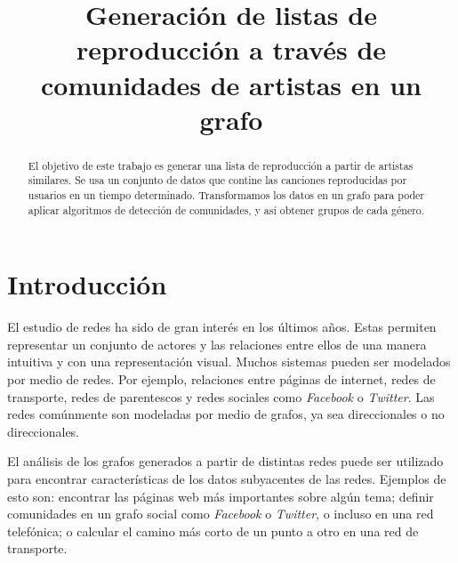 \documentclass[conference]{IEEEtran}
\begin{document}
\title{Generación de listas de reproducción a través de comunidades de artistas en un grafo}


\author{
\and
{}
\and
{}
}

\maketitle


\begin{abstract}
El objetivo de este trabajo es generar una lista de reproducción
a partir de artistas similares. Se usa un conjunto de datos que contine las canciones reproducidas por usuarios en un tiempo determinado. Transformamos los datos en un grafo para poder aplicar algoritmos de  detección de comunidades, y así obtener grupos de cada género. 
\end{abstract}

\section{Introducción}

El estudio de redes ha sido de gran interés en los últimos años. Estas permiten representar un conjunto de actores y las relaciones entre ellos de una manera intuitiva y con una representación visual. Muchos sistemas pueden ser modelados por medio de redes. Por ejemplo, relaciones entre páginas de internet, redes de transporte, redes de parentescos y redes sociales como \textit{Facebook} o \textit{Twitter}. Las redes comúnmente son modeladas por medio de grafos, ya sea direccionales o no direccionales. 

El análisis de los grafos generados a partir de distintas redes puede ser utilizado para encontrar características de los datos subyacentes de las redes. Ejemplos de esto son: encontrar las páginas web más importantes sobre algún tema; definir comunidades en un grafo social como \textit{Facebook} o \textit{Twitter}, o incluso en una red telefónica; o calcular el camino más corto de un punto a otro en una red de transporte.
\end{document}
